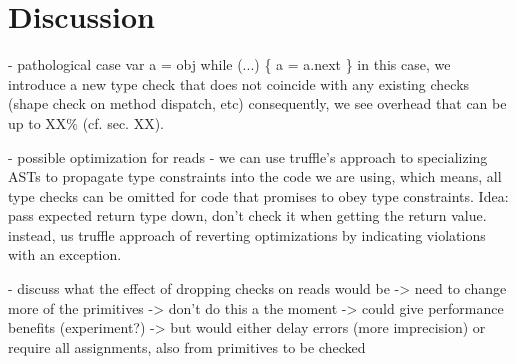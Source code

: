 
\section{Discussion}
\label{sec:discussion}


\begin{cnote}
  \label{sec:disc-pathological-case}
- pathological case
  var a = obj
  while (...) \{
    a = a.next
  \}
  in this case, we introduce a new type check that does not coincide with any
  existing checks (shape check on method dispatch, etc)
  consequently, we see overhead that can be up to XX\% (cf. sec. XX).


- possible optimization for reads
  - we can use truffle's approach to specializing ASTs to propagate
    type constraints into the code we are using, which means,
    all type checks can be omitted for code that promises to obey
    type constraints.
    Idea: pass expected return type down, don't check it when getting
     the return value. instead, us truffle approach of reverting optimizations
     by indicating violations with an exception.
 
 
 - discuss what the effect of dropping checks on reads would be
   -> need to change more of the primitives
   -> don't do this a the moment
   -> could give performance benefits (experiment?)
   -> but would either delay errors (more imprecision)
      or require all assignments, also from primitives to be checked
\end{cnote}

